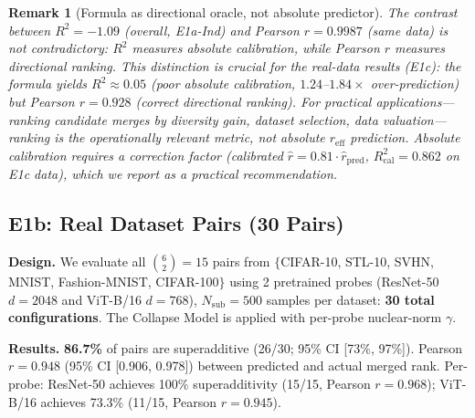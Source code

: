 \documentclass{article}
\newtheorem{remark}{Remark}
\begin{document}
\begin{remark}[Formula as directional oracle, not absolute predictor]
\label{rem:r2_vs_pearson}
The contrast between $R^2=-1.09$ (overall, E1a-Ind) and Pearson $r=0.9987$ (same data)
is not contradictory: $R^2$ measures absolute calibration, while Pearson $r$ measures
directional ranking.
This distinction is crucial for the real-data results (E1c): the formula yields
$R^2\approx0.05$ (poor absolute calibration, $1.24$--$1.84\times$ over-prediction)
but Pearson $r=0.928$ (correct directional ranking).
For practical applications---ranking candidate merges by diversity gain,
dataset selection, data valuation---\emph{ranking} is the operationally relevant metric,
not absolute $r_{\mathrm{eff}}$ prediction.
Absolute calibration requires a correction factor (calibrated $\hat{r}=0.81\cdot\hat{r}_{\mathrm{pred}}$,
$R^2_{\mathrm{cal}}=0.862$ on E1c data), which we report as a practical recommendation.
\end{remark}

\subsection{E1b: Real Dataset Pairs (30 Pairs)}
\label{sec:e1b}

\textbf{Design.}
We evaluate all $\binom{6}{2}=15$ pairs from
$\{$CIFAR-10, STL-10, SVHN, MNIST, Fashion-MNIST, CIFAR-100$\}$
using 2 pretrained probes (ResNet-50 \citep{he2016resnet} $d{=}2048$
and ViT-B/16 \citep{dosovitskiy2021vit} $d{=}768$),
$N_{\mathrm{sub}}=500$ samples per dataset: \textbf{30 total configurations}.
The Collapse Model is applied with per-probe nuclear-norm $\gamma$.

\textbf{Results.}
\textbf{86.7\%} of pairs are superadditive (26/30; 95\% CI [73\%, 97\%]).
Pearson $r=0.948$ (95\% CI [0.906, 0.978]) between predicted and actual merged rank.
Per-probe: ResNet-50 achieves 100\% superadditivity (15/15, Pearson $r=0.968$);
ViT-B/16 achieves 73.3\% (11/15, Pearson $r=0.945$).
\end{document}
